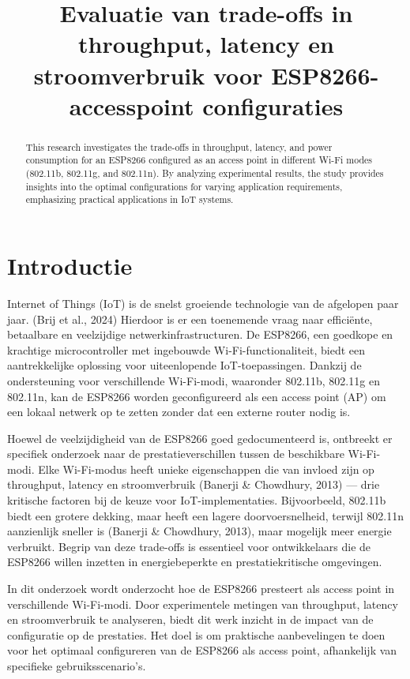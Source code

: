 \documentclass[conference]{IEEEtran}
\begin{document}
\title{Evaluatie van trade-offs in throughput, latency en stroomverbruik voor ESP8266-accesspoint configuraties}

\author{
}

\maketitle

\begin{abstract}
This research investigates the trade-offs in throughput, latency, and power consumption for an ESP8266 configured as an access point in different Wi-Fi modes (802.11b, 802.11g, and 802.11n). By analyzing experimental results, the study provides insights into the optimal configurations for varying application requirements, emphasizing practical applications in IoT systems.
\end{abstract}

\section{Introductie}
Internet of Things (IoT) is de snelst groeiende technologie van de afgelopen paar jaar. (Brij et al., 2024) Hierdoor is er een toenemende vraag naar efficiënte, betaalbare en veelzijdige netwerkinfrastructuren. De ESP8266, een goedkope en krachtige microcontroller met ingebouwde Wi-Fi-functionaliteit, biedt een aantrekkelijke oplossing voor uiteenlopende IoT-toepassingen. Dankzij de ondersteuning voor verschillende Wi-Fi-modi, waaronder 802.11b, 802.11g en 802.11n, kan de ESP8266 worden geconfigureerd als een access point (AP) om een lokaal netwerk op te zetten zonder dat een externe router nodig is.

Hoewel de veelzijdigheid van de ESP8266 goed gedocumenteerd is, ontbreekt er specifiek onderzoek naar de prestatieverschillen tussen de beschikbare Wi-Fi-modi. Elke Wi-Fi-modus heeft unieke eigenschappen die van invloed zijn op throughput, latency en stroomverbruik (Banerji \& Chowdhury, 2013) — drie kritische factoren bij de keuze voor IoT-implementaties. Bijvoorbeeld, 802.11b biedt een grotere dekking, maar heeft een lagere doorvoersnelheid, terwijl 802.11n aanzienlijk sneller is (Banerji \& Chowdhury, 2013), maar mogelijk meer energie verbruikt. Begrip van deze trade-offs is essentieel voor ontwikkelaars die de ESP8266 willen inzetten in energiebeperkte en prestatiekritische omgevingen.

In dit onderzoek wordt onderzocht hoe de ESP8266 presteert als access point in verschillende Wi-Fi-modi. Door experimentele metingen van throughput, latency en stroomverbruik te analyseren, biedt dit werk inzicht in de impact van de configuratie op de prestaties. Het doel is om praktische aanbevelingen te doen voor het optimaal configureren van de ESP8266 als access point, afhankelijk van specifieke gebruiksscenario's. 
\end{document}
